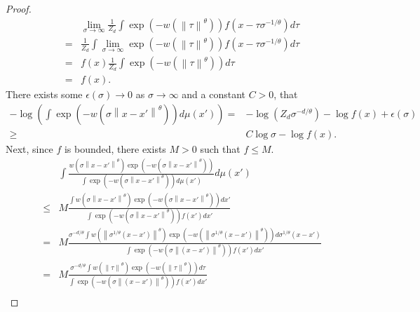 \documentclass[10pt]{article}
\newcommand{\norm}[1]{\left\lVert#1\right\rVert}
\newenvironment{Proof of lemma}{\noindent{\bf Proof of Lemma}}{\hfill$\Box$\newline}
\newenvironment{Proof of claim}{\noindent{\bf Proof of claim}}{\hfill$\Box$\newline}
\newenvironment{Proof of theorem}{\noindent{\bf Proof of Theorem}}{\hfill\scriptsize{$\Box$}\newline}
\newenvironment{Proof of theorems}{\noindent{\bf Proof of Theorems}}{\hfill$\Box$\newline}
\newenvironment{Proof of proposition}{\noindent{\bf Proof of Proposition}}{\hfill$\Box$\newline}
\newenvironment{Proof of propositions}{\noindent{\bf Proof of Propositions}}{\hfill$\Box$\newline}
\newenvironment{Proof of exercise}{\noindent{\it Proof of Exercise:}}{\hfill$\Box$}
\numberwithin{equation}{section}
\begin{document}
\begin{proof}
    \begin{align}
          & \lim_{\sigma \to \infty} \frac{1}{Z_d} \int \exp(-w(\norm{\tau}^{\theta})) f(x-\tau \sigma^{-1/\theta}) d\tau \nonumber \\
        = & \frac{1}{Z_d} \int \lim_{\sigma \to \infty} \exp(-w(\norm{\tau}^{\theta})) f(x-\tau \sigma^{-1/\theta}) d\tau \nonumber \\
        = & f(x) \frac{1}{Z_d} \int \exp(-w(\norm{\tau}^{\theta})) d\tau \nonumber                                                  \\
        = & f(x).
    \end{align}
    There exists some $\epsilon(\sigma) \to 0$ as $\sigma\to \infty$ and a constant $C>0$, that
    \begin{align} \label{big_f_lowerbound_1}
        -\log \left(\int \exp(-w(\sigma\norm{x-x'}^{\theta}))d\mu(x')\right) = & -\log\left(Z_d \sigma^{-d/\theta}\right) - \log f(x)+ \epsilon(\sigma) \nonumber \\
        \geq                                                                   & C\log \sigma - \log f(x).
    \end{align}
    Next, since $f$ is bounded, there exists $M>0$ such that $f \leq M$.
    \begin{align} \label{big_F_lowerbound_2}
             & \int \frac{w(\sigma\norm{x-x'}^{\theta})\exp(-w(\sigma\norm{x-x'}^{\theta}))}{\int \exp(-w(\sigma\norm{x-x'}^{\theta})) d\mu(x')} d\mu(x') \nonumber                                                                  \\
        \leq & M \frac{\int w(\sigma\norm{x-x'}^{\theta})\exp(-w(\sigma\norm{x-x'}^{\theta}))dx'}{\int \exp(-w(\sigma\norm{x-x'}^{\theta}))f(x') dx'} \nonumber                                                                      \\
        =    & M \frac{\sigma^{-d/\theta}\int w(\norm{\sigma^{1/\theta}(x-x')}^{\theta})\exp(-w(\norm{\sigma^{1/\theta}(x-x')}^{\theta}))d\sigma^{1/\theta}(x-x')}{ \int \exp(-w(\sigma \norm{(x-x')}^{\theta}))f(x') dx'} \nonumber \\
        =    & M \frac{\sigma^{-d/\theta}\int w(\norm{\tau}^{\theta})\exp(-w(\norm{\tau}^{\theta}))d\tau}{ \int \exp(-w(\sigma \norm{(x-x')}^{\theta}))f(x') dx'} \nonumber                                                          \\

\end{align}
\end{proof}
\end{document}
